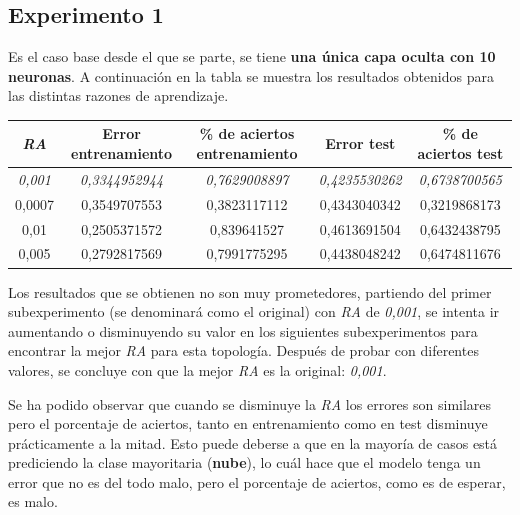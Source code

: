 \documentclass{uc3mpracticas}
\begin{document}
\subsection{Experimento 1}

Es el caso base desde el que se parte, se tiene \textbf{una única capa oculta con 10 neuronas}. A continuación en la tabla se muestra los resultados obtenidos para las distintas razones de aprendizaje.

\begin{center}
  \begin{tabular}{|c|c|c|c|c|}
    \hline
        \textit{\textbf{RA}}  & \textbf{Error entrenamiento} & \textbf{\% de aciertos entrenamiento} & \textbf{Error test} & \textbf{\% de aciertos test}\\ \hline
        \textit{0,001}        &  \textit{0,3344952944}       &  \textit{0,7629008897}                & \textit{0,4235530262}& \textit{0,6738700565}      \\ \hline
        0,0007                &  0,3549707553                &  0,3823117112                         &  0,4343040342       &  0,3219868173               \\ \hline
        0,01                  &  0,2505371572                &  0,839641527                          &  0,4613691504       &  0,6432438795               \\ \hline
        0,005                 &  0,2792817569                &  0,7991775295                         &  0,4438048242       &  0,6474811676               \\ \hline

  \end{tabular}
\end{center}

Los resultados que se obtienen no son muy prometedores, partiendo del primer subexperimento (se denominará como el original) con \textit{RA} de \textit{0,001}, se intenta ir aumentando o disminuyendo su valor en los siguientes subexperimentos para encontrar la mejor \textit{RA} para esta topología. Después de probar con diferentes valores, se concluye con que la mejor \textit{RA} es la original: \textit{0,001}.

\vspace{2mm}

Se ha podido observar que cuando se disminuye la \textit{RA} los errores son similares pero el porcentaje de aciertos, tanto en entrenamiento como en test disminuye prácticamente a la mitad. Esto puede deberse a que en la mayoría de casos está prediciendo la clase mayoritaria (\textbf{nube}), lo cuál hace que el modelo tenga un error que no es del todo malo, pero el porcentaje de aciertos, como es de esperar, es malo.
\end{document}
